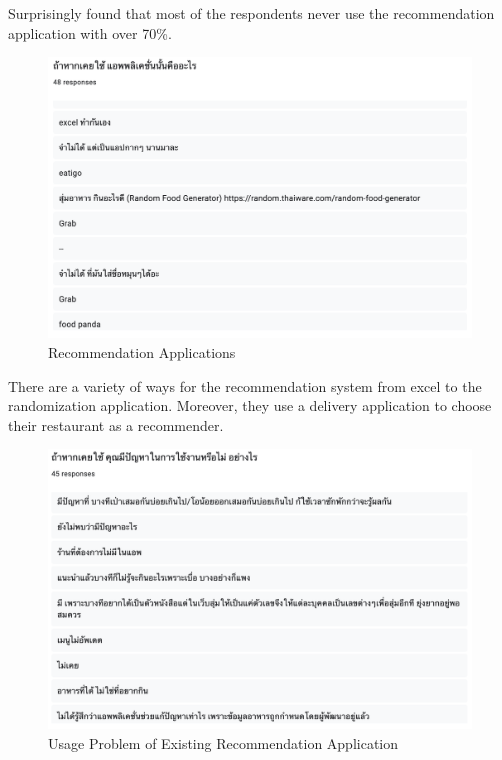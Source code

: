 \documentclass[12pt,oneside,openright,a4paper]{cpe-english-project}
\begin{document}
Surprisingly found that most of the respondents never use the recommendation application with over 70\%.

\begin{figure}[H]\centering
\includegraphics[width=350pt]{./images/A1RecommendationApplications.png}
\caption{Recommendation Applications}\label{fig:A1RecommendationApplications}
\end{figure}\vspace{-24pt}

There are a variety of ways for the recommendation system from excel to the randomization application. Moreover, they use a delivery application to choose their restaurant as a recommender.

\begin{figure}[H]\centering
\includegraphics[width=350pt]{./images/A1UsageProblemofExistingRecommendationApplication.png}
\caption{Usage Problem of Existing Recommendation Application}\label{fig:A1UsageProblemofExistingRecommendationApplication}
\end{figure}\vspace{-24pt}
\end{document}
